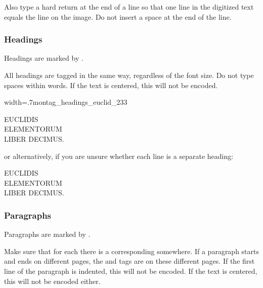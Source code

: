 \begin{clarification}
Also type a hard return at the end of a line so that one line in the digitized text equals the line on the image. Do not insert a space at the end of the line.
\end{clarification}

\subsubsection{Headings}
\label{section headings}

\begin{mainrule}
Headings are marked by .
\end{mainrule}

\begin{clarification}
All headings are tagged in the same way, regardless of the font size. Do not type spaces within words. If the text is centered, this will not be encoded.
\end{clarification}

\begin{sampleImageSmall}{width=.7\linewidth}{montag_headings_euclid_233}
\begin{typeLatin}
EUCLIDIS \\
ELEMENTORUM \\
LIBER DECIMUS.
\end{typeLatin}
or alternatively, if you are unsure whether each line is a separate heading:
\begin{typeLatin}
EUCLIDIS \\
ELEMENTORUM \\
LIBER DECIMUS.
\end{typeLatin}
\end{sampleImageSmall}


\subsubsection{Paragraphs}
\label{section paragraphs}

\begin{mainrule}
Paragraphs are marked by .
\end{mainrule}

\begin{clarification}
Make sure that for each  there is a corresponding  somewhere. If a paragraph starts and ends on different pages, the  and  tags are on these different pages.
If the first line of the paragraph is indented, this will not be encoded. If the text is centered, this will not be encoded either.
\end{clarification}

